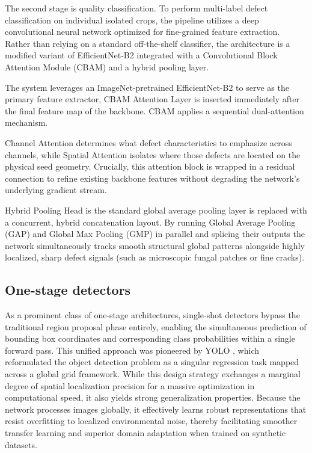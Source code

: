 

The second stage is quality classification. To perform multi-label defect classification on individual isolated crops, the pipeline utilizes a deep convolutional neural network optimized for fine-grained feature extraction. Rather than relying on a standard off-the-shelf classifier, the architecture is a modified variant of EfficientNet-B2 integrated with a Convolutional Block Attention Module (CBAM) and a hybrid pooling layer.\cite{tan2019efficientnet} 

The system leverages an ImageNet-pretrained EfficientNet-B2 to serve as the primary feature extractor, CBAM Attention Layer is inserted immediately after the final feature map of the backbone. CBAM applies a sequential dual-attention mechanism. 

Channel Attention determines what defect characteristics to emphasize across channels, while Spatial Attention isolates where those defects are located on the physical seed geometry. Crucially, this attention block is wrapped in a residual connection to refine existing backbone features without degrading the network's underlying gradient stream.

Hybrid Pooling Head is the standard global average pooling layer is replaced with a concurrent, hybrid concatenation layout. By running Global Average Pooling (GAP) and Global Max Pooling (GMP) in parallel and splicing their outputs the network simultaneously tracks smooth structural global patterns alongside highly localized, sharp defect signals (such as microscopic fungal patches or fine cracks).

\subsection{One-stage detectors}

As a prominent class of one-stage architectures, single-shot detectors bypass the traditional region proposal phase entirely, enabling the simultaneous prediction of bounding box coordinates and corresponding class probabilities within a single forward pass. This unified approach was pioneered by YOLO \cite{redmon2016yolo}, which reformulated the object detection problem as a singular regression task mapped across a global grid framework. While this design strategy exchanges a marginal degree of spatial localization precision for a massive optimization in computational speed, it also yields strong generalization properties. Because the network processes images globally, it effectively learns robust representations that resist overfitting to localized environmental noise, thereby facilitating smoother transfer learning and superior domain adaptation when trained on synthetic datasets. 


